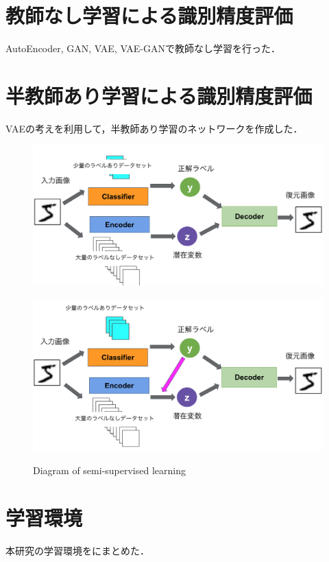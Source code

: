 \section{教師なし学習による識別精度評価}
AutoEncoder, GAN, VAE, VAE-GANで教師なし学習を行った．


\section{半教師あり学習による識別精度評価}
VAEの考えを利用して，半教師あり学習のネットワークを作成した．

\begin{figure}[H]
	\centering
	\begin{minipage}{\columnwidth}
		\centering
		\includegraphics[width=0.7\linewidth]{fig/chapter3/networks/patern_A}
		\label{fig:VAE-a}
	\end{minipage}
	
	\begin{minipage}{\columnwidth}
		\centering
		\includegraphics[width=0.7\linewidth]{fig/chapter3/networks/patern_B}
		\label{fig:VAE-b}
	\end{minipage}
	
	\caption{Diagram of semi-supervised learning}
	\label{fig:半教師}
	
\end{figure}



\section{学習環境}
本研究の学習環境をにまとめた．

